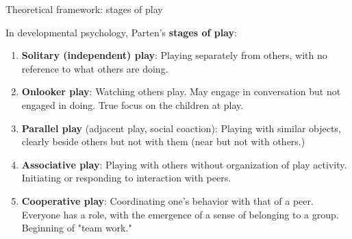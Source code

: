 \documentclass[compress]{beamer}
\begin{document}
{
\begin{frame}{Theoretical framework: stages of play}

    In developmental psychology, Parten's {\bf stages of play}:

    \begin{enumerate}
        \item<1-> {\bf Solitary (independent) play}: Playing separately from
            others, with no reference to what others are doing.
        \item<2-> {\bf Onlooker play}: Watching others play. May engage in
            conversation but not engaged in doing. True focus on the children at
            play.
        \item<3-> {\bf Parallel play} (adjacent play, social coaction): Playing
            with similar objects, clearly beside others but not with them (near
            but not with others.)
        \item<4-> {\bf Associative play}:  Playing with others without
            organization of play activity. Initiating or responding to
            interaction with peers. 
        \item<5-> {\bf Cooperative play}: Coordinating one’s behavior with that
            of a peer. Everyone has a role, with the emergence of a sense of
            belonging to a group. Beginning of "team work."
    \end{enumerate}

\end{frame}
}

\end{document}
